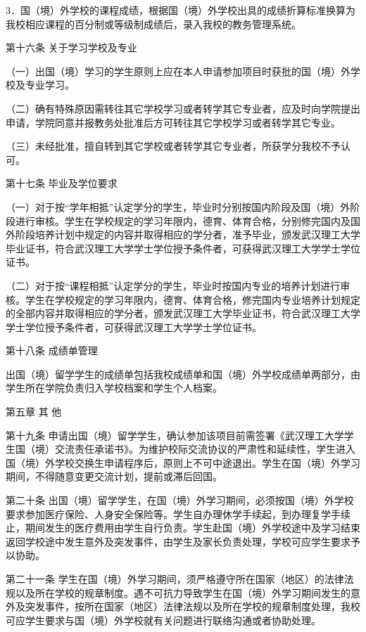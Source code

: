 \documentclass[UTF8,12pt,a4paper]{report}
\begin{document}
3．国（境）外学校的课程成绩，根据国（境）外学校出具的成绩折算标准换算为我校相应课程的百分制或等级制成绩后，录入我校的教务管理系统。

第十六条 关于学习学校及专业

（一）出国（境）学习的学生原则上应在本人申请参加项目时获批的国（境）外学校及专业学习。

（二）确有特殊原因需转往其它学校学习或者转学其它专业者，应及时向学院提出申请，学院同意并报教务处批准后方可转往其它学校学习或者转学其它专业。

（三）未经批准，擅自转到其它学校或者转学其它专业者，所获学分我校不予认可。

第十七条 毕业及学位要求

（一）对于按“学年相抵”认定学分的学生，毕业时分别按国内阶段及国（境）外阶段进行审核。学生在学校规定的学习年限内，德育、体育合格，分别修完国内及国外阶段培养计划中规定的内容并取得相应的学分者，准予毕业，颁发武汉理工大学毕业证书，符合武汉理工大学学士学位授予条件者，可获得武汉理工大学学士学位证书。

（二）对于按“课程相抵”认定学分的学生，毕业时按国内专业的培养计划进行审核。学生在学校规定的学习年限内，德育、体育合格，修完国内专业培养计划规定的全部内容并取得相应的学分者，颁发武汉理工大学毕业证书，符合武汉理工大学学士学位授予条件者，可获得武汉理工大学学士学位证书。

第十八条 成绩单管理

出国（境）留学学生的成绩单包括我校成绩单和国（境）外学校成绩单两部分，由学生所在学院负责归入学校档案和学生个人档案。

第五章 其 他

第十九条 申请出国（境）留学学生，确认参加该项目前需签署《武汉理工大学学生国（境）交流责任承诺书》。为维护校际交流协议的严肃性和延续性，学生进入国（境）外学校交换生申请程序后，原则上不可中途退出。学生在国（境）外学习期间，不得随意变更交流计划，提前或滞后回国。

第二十条 出国（境）留学学生，在国（境）外学习期间，必须按国（境）外学校要求参加医疗保险、人身安全保险等。学生自办理休学手续起，到办理复学手续止，期间发生的医疗费用由学生自行负责。学生赴国（境）外学校途中及学习结束返回学校途中发生意外及突发事件，由学生及家长负责处理，学校可应学生要求予以协助。

第二十一条 学生在国（境）外学习期间，须严格遵守所在国家（地区）的法律法规以及所在学校的规章制度。遇不可抗力导致学生在国（境）外学习期间发生的意外及突发事件，按所在国家（地区）法律法规以及所在学校的规章制度处理，我校可应学生要求与国（境）外学校就有关问题进行联络沟通或者协助处理。
\end{document}
